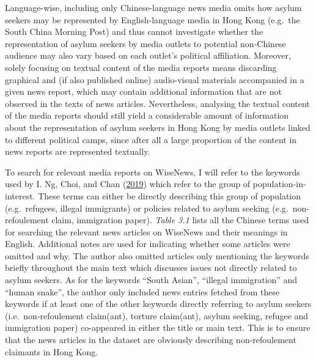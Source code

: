 \documentclass[a4paper, oneside]{report}
\begin{document}
Language-wise, including only Chinese-language news media omits how
asylum seekers may be represented by English-language media in Hong Kong
(e.g.~the South China Morning Post) and thus cannot investigate whether
the representation of asylum seekers by media outlets to potential
non-Chinese audience may also vary based on each outlet's political
affiliation. Moreover, solely focusing on textual content of the media
reports means discarding graphical and (if also published online)
audio-visual materials accompanied in a given news report, which may
contain additional information that are not observed in the texts of
news articles. Nevertheless, analysing the textual content of the media
reports should still yield a considerable amount of information about
the representation of asylum seekers in Hong Kong by media outlets
linked to different political camps, since after all a large proportion
of the content in news reports are represented textually.

To search for relevant media reports on WiseNews, I will refer to the
keywords used by I. Ng, Choi, and Chan
(\protect\hyperlink{ref-ngFramingIssueAsylum2019}{2019}) which refer to
the group of population-in-interest. These terms can either be directly
describing this group of population (e.g.~refugees, illegal immigrants)
or policies related to asylum seeking (e.g.~non-refoulement claim,
immigration paper). \emph{Table 3.1} lists all the Chinese terms used
for searching the relevant news articles on WiseNews and their meanings
in English. Additional notes are used for indicating whether some
articles were omitted and why. The author also omitted articles only
mentioning the keywords briefly throughout the main text which discusses
issues not directly related to asylum seekers. As for the keywords
``South Asian'', ``illegal immigration'' and ``human snake'', the author
only included news entries fetched from these keywords if at least one
of the other keywords directly referring to asylum seekers
(i.e.~non-refoulement claim(ant), torture claim(ant), asylum seeking,
refugee and immigration paper) co-appeared in either the title or main
text. This is to ensure that the news articles in the dataset are
obviously describing non-refoulement claimants in Hong Kong.
\end{document}
